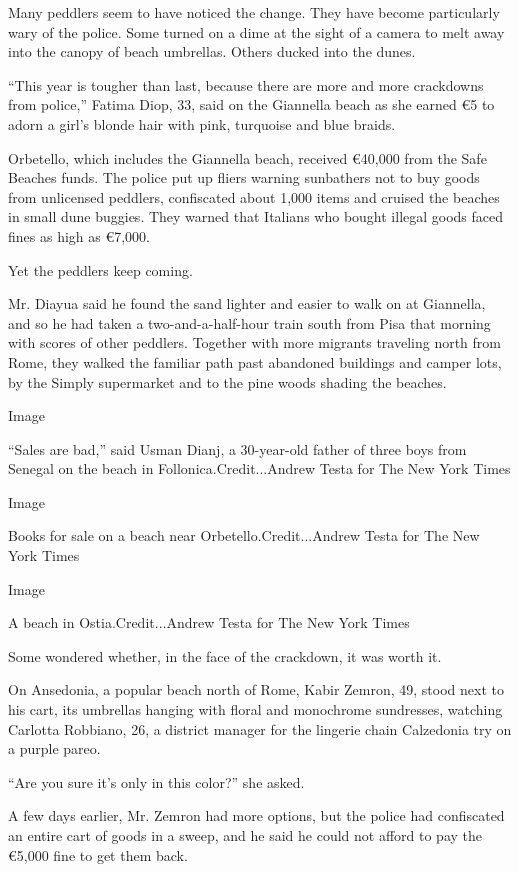 Many peddlers seem to have noticed the change. They have become
particularly wary of the police. Some turned on a dime at the sight of a
camera to melt away into the canopy of beach umbrellas. Others ducked
into the dunes.

``This year is tougher than last, because there are more and more
crackdowns from police,'' Fatima Diop, 33, said on the Giannella beach
as she earned €5 to adorn a girl's blonde hair with pink, turquoise and
blue braids.

Orbetello, which includes the Giannella beach, received €40,000 from the
Safe Beaches funds. The police put up fliers warning sunbathers not to
buy goods from unlicensed peddlers, confiscated about 1,000 items and
cruised the beaches in small dune buggies. They warned that Italians who
bought illegal goods faced fines as high as €7,000.

Yet the peddlers keep coming.

Mr. Diayua said he found the sand lighter and easier to walk on at
Giannella, and so he had taken a two-and-a-half-hour train south from
Pisa that morning with scores of other peddlers. Together with more
migrants traveling north from Rome, they walked the familiar path past
abandoned buildings and camper lots, by the Simply supermarket and to
the pine woods shading the beaches.

Image

``Sales are bad,'' said Usman Dianj, a 30-year-old father of three boys
from Senegal on the beach in Follonica.Credit...Andrew Testa for The New
York Times

Image

Books for sale on a beach near Orbetello.Credit...Andrew Testa for The
New York Times

Image

A beach in Ostia.Credit...Andrew Testa for The New York Times

Some wondered whether, in the face of the crackdown, it was worth it.

On Ansedonia, a popular beach north of Rome, Kabir Zemron, 49, stood
next to his cart, its umbrellas hanging with floral and monochrome
sundresses, watching Carlotta Robbiano, 26, a district manager for the
lingerie chain Calzedonia try on a purple pareo.

``Are you sure it's only in this color?'' she asked.

A few days earlier, Mr. Zemron had more options, but the police had
confiscated an entire cart of goods in a sweep, and he said he could not
afford to pay the €5,000 fine to get them back.


